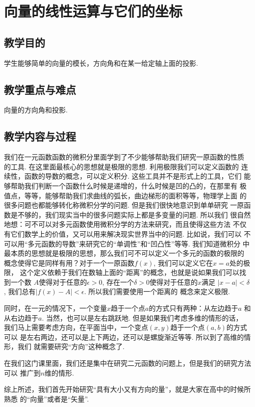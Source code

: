 \documentclass[a4paper, titlepage, twoside]{article}
\numberwithin{equation}{section}
\begin{document}
\section{向量的线性运算与它们的坐标}
\subsection{教学目的}
学生能够简单的向量的模长，方向角和在某一给定轴上面的投影. 
\subsection{教学重点与难点}
向量的方向角和投影. 
\subsection{教学内容与过程}


我们在一元函数函数的微积分里面学到了不少能够帮助我们研究一原函数的性质
的工具. 在这里面最核心的思想就是极限的思想. 利用极限我们可以定义函数的
连续性，函数的导数的概念，可以定义积分. 这些工具并不是形式上的工具，它们
能够帮助我们判断一个函数什么时候是递增的，什么时候是凹的凸的，在那里有
极值点，等等，能够帮助我们求曲线的弧长，曲边梯形的面积等等，物理学上面
的很多问题也都能够转化称微积分学的问题. 但是我们很快地意识到单单研究
一原函数是不够的，我们现实当中的很多问题实际上都是多变量的问题. 所以我们
很自然地想：可不可以对多元函数使用微积分学的方法来研究，而且使得这些方法
不仅有它们数学上的价值，又可以用来解决现实世界当中的问题. 比如说，我们可以
不可以用“多元函数的导数”来研究它的“单调性”和“凹凸性”等等. 我们知道微积分
中最本质的思想就是极限的思想，那么我们可不可以定义一个多元的函数的极限的
概念使得它是同样有用？对于一个一原函数$f(x)$, 我们可以定义它在$x=a$处的极限，
这个定义依赖于我们在数轴上面的“距离”的概念，也就是说如果我们可以找到一个数
$A$使得对于任意的$\epsilon >0$, 存在一个$\delta>0$使得对于任意的$x$满足
$|x-a|<\delta$, 我们总有$|f(x) -A| <\epsilon$. 所以我们需要使用一个距离的
概念来定义极限. 

同时，在一元的情况下，一个变量$x$趋于一个点$a$的方式只有两种：从左边趋于$a$
和从右边趋于$a$. 当然，也可以是左右跳跃地. 但是如果我们考虑多维的情形的话，
我们马上需要考虑方向，在平面当中，一个变点$(x,y)$趋于一个点$(a,b)$的方式可以
是左右两边，还可以是上下两边，还可以是螺旋渐近等等. 所以到了高维的情形，我们
就需要研究“方向”这种概念了. 

在我们这门课里面，我们还是集中在研究二元函数的问题上，但是我们的研究方法可以
推广到$n$维的情形. 

综上所述，我们首先开始研究“具有大小又有方向的量”，就是大家在高中的时候所熟悉
的“向量”或者是“矢量”.  
\end{document}
